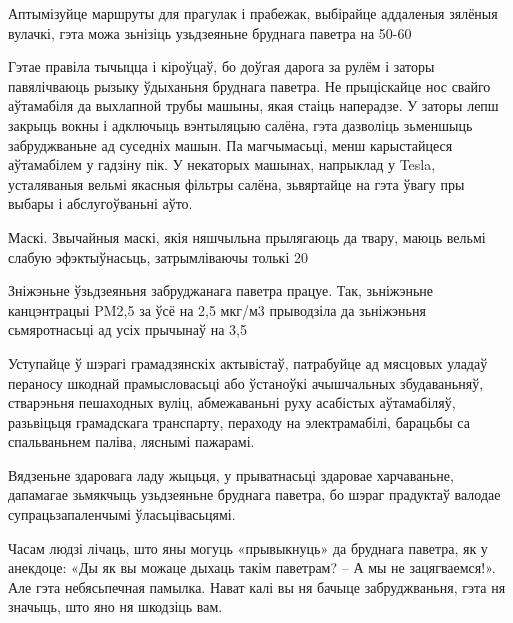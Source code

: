 Аптымізуйце маршруты для прагулак і прабежак, выбірайце аддаленыя зялёныя вулачкі, гэта можа зьнізіць узьдзеяньне бруднага паветра на 50-60%

Гэтае правіла тычыцца і кіроўцаў, бо доўгая дарога за рулём і заторы павялічваюць рызыку ўдыханьня бруднага паветра. Не прыціскайце нос свайго аўтамабіля да выхлапной трубы машыны, якая стаіць наперадзе. У заторы лепш закрыць вокны і адключыць вэнтыляцыю салёна, гэта дазволіць зьменшыць забруджваньне ад суседніх машын. Па магчымасьці, менш карыстайцеся аўтамабілем у гадзіну пік. У некаторых машынах, напрыклад у Tesla, усталяваныя вельмі якасныя фільтры салёна, зьвяртайце на гэта ўвагу пры выбары і абслугоўваньні аўто.

Маскі. Звычайныя маскі, якія няшчыльна прылягаюць да твару, маюць вельмі слабую эфэктыўнасьць, затрымліваючы толькі 20%

Зніжэньне ўзьдзеяньня забруджанага паветра працуе. Так, зьніжэньне канцэнтрацыі PM2,5 за ўсё на 2,5 мкг/м3 прыводзіла да зьніжэньня сьмяротнасьці ад усіх прычынаў на 3,5%

Уступайце ў шэрагі грамадзянскіх актывістаў, патрабуйце ад мясцовых уладаў пераносу шкоднай прамысловасьці або ўстаноўкі ачышчальных збудаваньняў, стварэньня пешаходных вуліц, абмежаваньні руху асабістых аўтамабіляў, разьвіцьця грамадскага транспарту, пераходу на электрамабілі, барацьбы са спальваньнем паліва, ляснымі пажарамі.

Вядзеньне здаровага ладу жыцьця, у прыватнасьці здаровае харчаваньне, дапамагае зьмякчыць узьдзеяньне бруднага паветра, бо шэраг прадуктаў валодае супрацьзапаленчымі ўласьцівасьцямі.

Часам людзі лічаць, што яны могуць «прывыкнуць» да бруднага паветра, як у анекдоце: «Ды як вы можаце дыхаць такім паветрам? – А мы не зацягваемся!». Але гэта небясьпечная памылка. Нават калі вы ня бачыце забруджваньня, гэта ня значыць, што яно ня шкодзіць вам.

